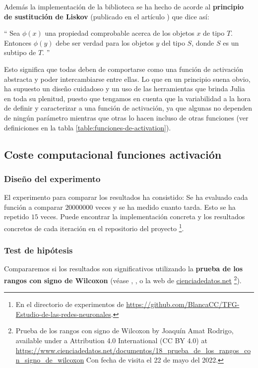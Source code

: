 Además la implementación de la biblioteca se ha hecho de acorde 
al \textbf{principio de sustitución de Liskov} (publicado en el artículo \cite{Liskov-principle}) que dice así: 

\enquote{
    Sea $\phi(x)$ una propiedad comprobable acerca de los objetos $x$ de tipo $T$. 
    Entonces $\phi(y)$  debe ser verdad para los objetos $y$ del tipo $S$, donde $S$ es un 
    subtipo de $T$. 
}

Esto significa que todas deben de comportarse
como una función de activación abstracta y poder intercambiarse entre ellas. 
Lo que en un principio suena obvio, ha supuesto un diseño cuidadoso y un uso de las herramientas que brinda Julia en toda 
su plenitud, puesto que tengamos en cuenta que la variabilidad a la hora de definir y caracterizar a una función de activación, ya que algunas no dependen de ningún parámetro 
mientras que otras lo hacen incluso de otras funciones (ver definiciones en la tabla \ref{table:funciones-de-activation}). 

\subsection{Coste computacional funciones activación }

\subsubsection{Diseño del experimento}
El experimento para comparar los resultados ha consistido: 
Se ha evaluado cada función a comparar $20000000$ veces y se ha medido cuanto tarda. 
Esto se ha repetido $15$ veces. Puede encontrar la implementación concreta y los resultados concretos de cada iteración en el repositorio del
proyecto \footnote{En el directorio de experimentos 
de \url{https://github.com/BlancaCC/TFG-Estudio-de-las-redes-neuronales}.}.

\subsubsection{Test de hipótesis}

Compararemos si los resultados son significativos utilizando la \textbf{prueba de los rangos con 
signo de Wilcoxon} (véase \cite{OpenIntroStatistics}, \cite{BiologicalStatistics}, o la web de \href{https://www.cienciadedatos.net}{cienciadedatos.net} \footnote{
 Prueba de los rangos con signo de Wilcoxon by Joaquín Amat Rodrigo, available under a Attribution 4.0 International (CC BY 4.0) at
  \url{https://www.cienciadedatos.net/documentos/18_prueba_de_los_rangos_con_signo_de_wilcoxon}
  Con fecha de visita el 22 de mayo del 2022.
  }).

